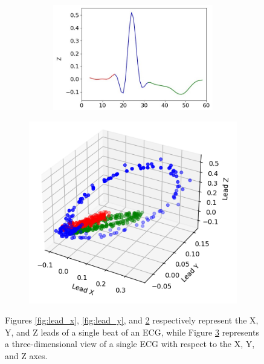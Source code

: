 \documentclass[12pt,italian]{report}
\begin{document}
\begin{figure}[H]
\begin{subfigure}{0.4\textwidth}
\begin{subfigure}{\textwidth}
            \includegraphics[width=1\textwidth]{images/lead_z.png}
            \caption{}
            \label{fig:lead_z}
        \end{subfigure}
    \end{subfigure}
    \begin{subfigure}{0.55\textwidth}
        \centering
        \includegraphics[width=1\linewidth]{images/frank_3d.png}
        \captionsetup{justification=centering}
        \caption{}
        \label{fig:frank_3d}
    \end{subfigure}
    \captionsetup{justification=centering}
    \caption{Figures \ref{fig:lead_x}, \ref{fig:lead_y}, and \ref{fig:lead_z} respectively represent the X, Y, and Z leads of a single beat of an ECG, while Figure \ref{fig:frank_3d} represents a three-dimensional view of a single ECG with respect to the X, Y, and Z axes.}
    \label{fig:ecg}
\end{figure}
\end{document}
